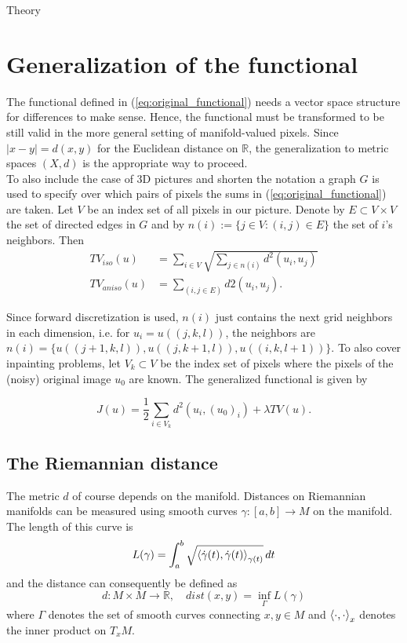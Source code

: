 \begin{chapter}{Theory}
\label{ch:theory}

\section{Generalization of the functional} %
\label{sec:Generalization of the functional}
The functional defined in (\ref{eq:original_functional}) needs a vector space structure for differences to make sense. Hence, the functional
must be transformed to be still valid in the more general setting of manifold-valued pixels. Since $|x-y|=d(x,y)$ for the 
Euclidean distance on $\mathbb{R}$, the generalization to metric spaces $(X,d)$ is the appropriate way to proceed.\\

To also include the case of 3D pictures and shorten the notation a graph $G$ is used to specify over which pairs of pixels the sums in (\ref{eq:original_functional})
are taken. Let $V$ be an index set of all pixels in our picture. Denote by $E\subset V\times V$ the set of directed edges in $G$ and by 
$n(i):=\lbrace j\in V: (i,j)\in E\rbrace$ the set of $i$'s neighbors. Then
\begin{align}
    TV_{iso}(u) &= \sum_{i\in V}\sqrt{\sum_{j\in n(i)}d^{2}(u_i,u_j)}\\
    TV_{aniso}(u) &= \sum_{(i,j\in E)}d{2}(u_i,u_j).
\end{align}

Since forward discretization is used, $n(i)$ just contains the next grid neighbors in each dimension, i.e. for $u_i=u((j,k,l))$, the neighbors are 
$n(i)=\lbrace u((j+1,k,l)), u((j,k+1,l)), u((i,k,l+1)) \rbrace$. To also cover inpainting problems, let $V_k\subset V$ be the index set of pixels
where the pixels of the (noisy) original image $u_0$ are known. The generalized functional is given by

\begin{equation}
    \label{eq:general_functional}
    J(u)=\frac{1}{2}\sum_{i\in V_k}d^2(u_i,(u_0)_i) +\lambda TV(u).
\end{equation}


\subsection{The Riemannian distance} %
\label{sub:RiemannianDistance}
The metric $d$ of course depends on the manifold. Distances on Riemannian manifolds can be measured using smooth curves
$\gamma: [a,b]\to M$ on the manifold. The length of this curve is
\begin{equation}
    L(\gamma) =\int_{a}^b\sqrt{\left\langle \dot{\gamma}(t),\dot{\gamma}(t) \right\rangle_{\gamma(t)}}\mathop{dt}
\end{equation}
and the distance can consequently be defined as
\begin{equation}
    d: M\times M\to \mathbb{R},\quad dist(x,y)=\operatorname{inf}_{\Gamma}L(\gamma)
\end{equation}
where $\Gamma$ denotes the set of smooth curves connecting $x,y\in M$ and $\left\langle \cdot,\cdot \right\rangle_x$ denotes the inner product on $T_xM$.\\


\end{chapter}
